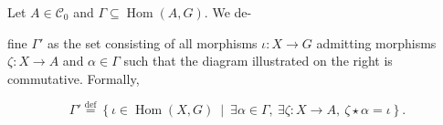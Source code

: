    
   
   
   
   
   \begin{definition}
       \label{def:weight_excluding}
       Let \( A \in \mathcal{C}_0 \) and $\Gamma \subseteq \operatorname{Hom}(A,G)$. We de-
       \newline
       \noindent
       \begin{minipage}{0.6\textwidth}
         fine $\Gamma'$ as the set consisting of all morphisms \( \iota : X \to G \) admitting morphisms \( \zeta \colon X \to A \) and \( \alpha \in \Gamma \) such that the diagram illustrated on the right is commutative. Formally, 
       \end{minipage}
       \begin{minipage}{0.4\textwidth}
           \hfill 
       \end{minipage}
   
       \[
       \Gamma' \overset{\operatorname{def}}{=} \left\{ \iota \in \operatorname{Hom}(X, G)~\middle|~\exists \alpha \in \Gamma,~\exists \zeta:X \to A,~\zeta \star \alpha = \iota \right\}.
       \]
   

\end{definition}
